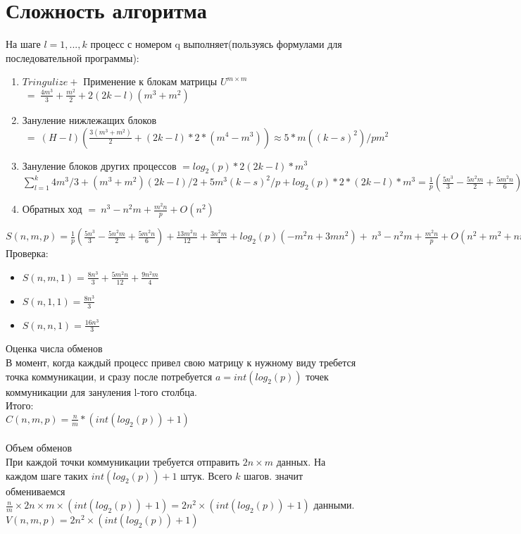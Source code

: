 \documentclass[a4paper,12pt]{article}
\begin{document}
\section{Сложность алгоритма}
На шаге $l = 1,...,k$ процесс с номером q выполняет(пользуясь формулами для последовательной программы):
\begin{enumerate}
    \item $Tringulize + $ Применение к блокам матрицы $U^{m \times m}$ $\ = \ \frac{4m^3}{3} + \frac{m^2}{2} + 2(2k-l)(m^3+m^2)$
    \item Зануление нижлежащих блоков $ \ =  \ (H-l)(\frac{3(m^3+m^2)}{2} + (2k-l)*2*(m^4-m^3)) \approx 5*m((k-s)^2)/pm^2$
    \item Зануление блоков других процессов $= log_{2}(p)*2(2k-l)*m^3$ \\
$\sum\limits_{l=1}^{k}{4m^3/3 + (m^3+m^2)}(2k-l)/2+5m^3(k-s)^2/p + log_{2}(p)*2*(2k-l)*m^3 = \frac{1}{p}(\frac{5n^3}{3} - \frac{5n^2m}{2}+\frac{5m^2n}{6}) +\frac{13m^2n}{12}+ \frac{3n^2m}{4}+ log_{2}(p)(-m^2n+3mn^2) + O(n^2+m^2+nm)$
    \item  Обратных ход $ = \ n^3 - n^2m + \frac{m^2n}{p}+ O(n^2)$
\end{enumerate}
$S(n,m,p) =\frac{1}{p}(\frac{5n^3}{3} - \frac{5n^2m}{2}+\frac{5m^2n}{6}) +\frac{13m^2n}{12}+ \frac{3n^2m}{4}+ log_{2}(p)(-m^2n+3mn^2) + \ n^3 - n^2m + \frac{m^2n}{p}+ O(n^2+m^2+nm) $
Проверка:
\begin{itemize}
    \item $S(n,m,1) = \frac{8n^3}{3}+\frac{5m^2n}{12}+\frac{9n^2m}{4}$
    \item  $S(n,1,1) = \frac{8n^3}{3}$
    \item $S(n,n,1) = \frac{16n^3}{3}$
\end{itemize}

{\fontsize{14}{14}\selectfont Оценка числа обменов}\\
В момент, когда каждый процесс привел свою матрицу к нужному виду требется точка коммуникации, и сразу после потребуется $a = int(log_{2}(p))$ точек коммуникации для зануления l-того столбца. \\
Итого:
\\ $C(n,m,p) = \frac{n}{m}*(int(log_{2}(p))+1)$\\\\
{\fontsize{14}{14}\selectfont Объем обменов}\\
При каждой точки коммуникации требуется отправить $2n\times m$ данных. На каждом шаге таких $int(log_{2}(p))+1$ штук. Всего $k$ шагов. значит обмениваемся $\frac{n}{m} \times 2n \times m \times (int(log_{2}(p))+1) = 2n^2 \times (int(log_{2}(p))+1)$ данными.\\
$V(n,m,p) = 2n^2 \times (int(log_{2}(p))+1)$
\end{document}
